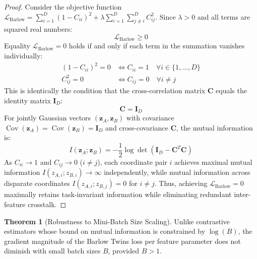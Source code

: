 \documentclass[11pt,a4paper]{article}
\theoremstyle{definition}
\newtheorem{theorem}{\textbf{Theorem}}[section]
\begin{document}
\begin{proof}
Consider the objective function $\mathcal{L}_{\text{Barlow}} = \sum_{i=1}^D (1 - C_{ii})^2 + \lambda \sum_{i=1}^D \sum_{j \ne i}^D C_{ij}^2$.
Since $\lambda > 0$ and all terms are squared real numbers:
{\boldmath
\begin{equation}
\mathcal{L}_{\text{Barlow}} \ge 0
\end{equation}
}
Equality $\mathcal{L}_{\text{Barlow}} = 0$ holds if and only if each term in the summation vanishes individually:
{\boldmath
\begin{align}
(1 - C_{ii})^2 = 0 &\iff C_{ii} = 1 \quad \forall i \in \{1, \dots, D\} \\
C_{ij}^2 = 0 &\iff C_{ij} = 0 \quad \forall i \ne j
\end{align}
}
This is identically the condition that the cross-correlation matrix $\mathbf{C}$ equals the identity matrix $\mathbf{I}_D$:
{\boldmath
\begin{equation}
\mathbf{C} = \mathbf{I}_D
\end{equation}
}
For jointly Gaussian vectors $(\mathbf{z}_A, \mathbf{z}_B)$ with covariance $\operatorname{Cov}(\mathbf{z}_A) = \operatorname{Cov}(\mathbf{z}_B) = \mathbf{I}_D$ and cross-covariance $\mathbf{C}$, the mutual information is:
{\boldmath
\begin{equation}
I(\mathbf{z}_A; \mathbf{z}_B) = -\frac{1}{2} \log \det\left( \mathbf{I}_D - \mathbf{C}^T \mathbf{C} \right)
\end{equation}
}
As $C_{ii} \to 1$ and $C_{ij} \to 0$ ($i \ne j$), each coordinate pair $i$ achieves maximal mutual information $I(z_{A, i}; z_{B, i}) \to \infty$ independently, while mutual information across disparate coordinates $I(z_{A, i}; z_{B, j}) = 0$ for $i \ne j$.
Thus, achieving $\mathcal{L}_{\text{Barlow}} = 0$ maximally retains task-invariant information while eliminating redundant inter-feature crosstalk.
\end{proof}

\begin{theorem}[Robustness to Mini-Batch Size Scaling]
Unlike contrastive estimators whose bound on mutual information is constrained by $\log(B)$, the gradient magnitude of the Barlow Twins loss per feature parameter does not diminish with small batch sizes $B$, provided $B > 1$.
\end{theorem}
\end{document}
